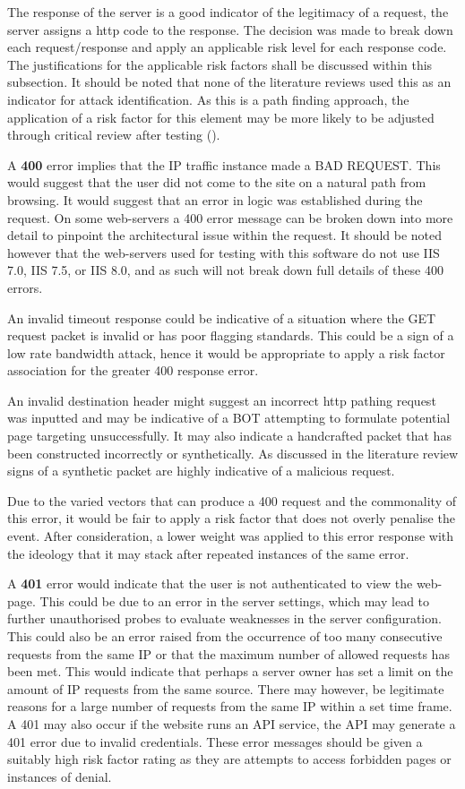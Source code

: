 The response of the server is a good indicator of the legitimacy of a request, the server assigns a http code to the response. The decision was made to break down each request/response and apply an applicable risk level for each response code. The justifications for the applicable risk factors shall be discussed within this subsection. It should be noted that none of the literature reviews used this as an indicator for attack identification. As this is a path finding approach, the application of a risk factor for this element may be more likely to be adjusted through critical review after testing (\cite{ErrorCodes}).

A \textbf{400} error implies that the IP traffic instance made a BAD REQUEST. This would suggest that the user did not come to the site on a natural path from browsing. It would suggest that an error in logic was established during the request. On some web-servers a 400 error message can be broken down into more detail to pinpoint the architectural issue within the request. It should be noted however that the web-servers used for testing with this software do not use  IIS 7.0, IIS 7.5, or IIS 8.0, and as such will not break down full details of these 400 errors.

An invalid timeout response could be indicative of a situation where the GET request packet is invalid or has poor flagging standards. This could be a sign of a low rate bandwidth attack, hence it would be appropriate to apply a risk factor association for the greater 400 response error. 

An invalid destination header might suggest an incorrect http pathing request was inputted and may be indicative of a BOT attempting to formulate potential page targeting unsuccessfully. It may also indicate a handcrafted packet that has been constructed incorrectly or synthetically. As discussed in the literature review signs of a synthetic packet are highly indicative of a malicious request.

Due to the varied vectors that can produce a 400 request and the commonality of this error, it would be fair to apply a risk factor that does not overly penalise the event. After consideration, a lower weight was applied to this error response with the ideology that it may stack after repeated instances of the same error.

A \textbf{401} error would indicate that the user is not authenticated to view the web-page. This could be due to an error in the server settings, which may lead to further unauthorised probes to evaluate weaknesses in the server configuration. This could also be an error raised from the occurrence of too many consecutive requests from the same IP or that the maximum number of allowed requests has been met. This would indicate that perhaps a server owner has set a limit on the amount of IP requests from the same source. There may however, be legitimate reasons for a large number of requests from the same IP within a set time frame. A 401 may also occur if the website runs an API service, the API may generate a 401 error due to invalid credentials. These error messages should be given a suitably high risk factor rating as they are attempts to access forbidden pages or instances of denial. 

